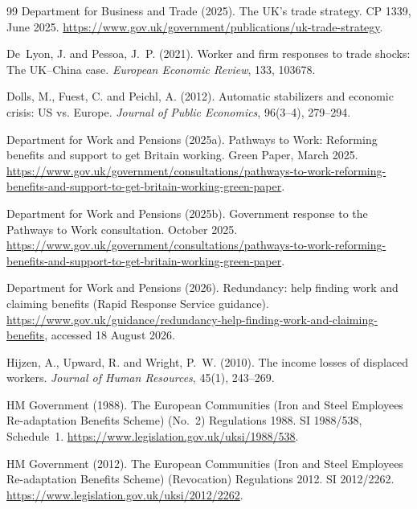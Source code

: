 \begin{thebibliography}{99}
Department for Business and Trade (2025).
\newblock The UK's trade strategy.
\newblock CP 1339, June 2025. \url{https://www.gov.uk/government/publications/uk-trade-strategy}.

De~Lyon, J. and Pessoa, J.~P. (2021).
\newblock Worker and firm responses to trade shocks: The UK--China case.
\newblock \emph{European Economic Review}, 133, 103678.

Dolls, M., Fuest, C. and Peichl, A. (2012).
\newblock Automatic stabilizers and economic crisis: US vs. Europe.
\newblock \emph{Journal of Public Economics}, 96(3--4), 279--294.

Department for Work and Pensions (2025a).
\newblock Pathways to Work: Reforming benefits and support to get Britain working.
\newblock Green Paper, March 2025. \url{https://www.gov.uk/government/consultations/pathways-to-work-reforming-benefits-and-support-to-get-britain-working-green-paper}.

Department for Work and Pensions (2025b).
\newblock Government response to the Pathways to Work consultation.
\newblock October 2025. \url{https://www.gov.uk/government/consultations/pathways-to-work-reforming-benefits-and-support-to-get-britain-working-green-paper}.

Department for Work and Pensions (2026).
\newblock Redundancy: help finding work and claiming benefits (Rapid Response Service guidance).
\newblock \url{https://www.gov.uk/guidance/redundancy-help-finding-work-and-claiming-benefits}, accessed 18 August 2026.

Hijzen, A., Upward, R. and Wright, P.~W. (2010).
\newblock The income losses of displaced workers.
\newblock \emph{Journal of Human Resources}, 45(1), 243--269.

HM Government (1988).
\newblock The European Communities (Iron and Steel Employees Re-adaptation Benefits Scheme) (No.~2) Regulations 1988.
\newblock SI 1988/538, Schedule~1. \url{https://www.legislation.gov.uk/uksi/1988/538}.

HM Government (2012).
\newblock The European Communities (Iron and Steel Employees Re-adaptation Benefits Scheme) (Revocation) Regulations 2012.
\newblock SI 2012/2262. \url{https://www.legislation.gov.uk/uksi/2012/2262}.


\end{thebibliography}
